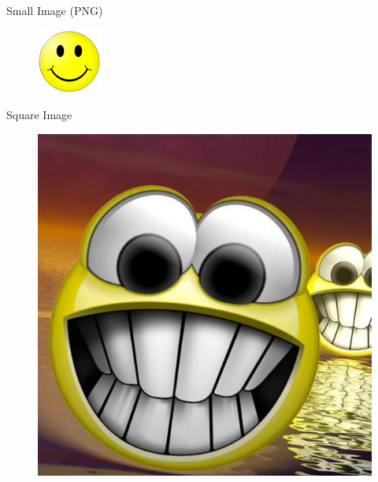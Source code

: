 \begin{frame}{Small Image (PNG)}

\begin{figure}[htbp]
\centering
\includegraphics[width=\textwidth,height=0.8\textheight,keepaspectratio]{images/small}
\end{figure}

\end{frame}

\begin{frame}{Square Image}

\begin{figure}[htbp]
\centering
\includegraphics[width=\textwidth,height=0.8\textheight,keepaspectratio]{images/square}
\end{figure}

\end{frame}


